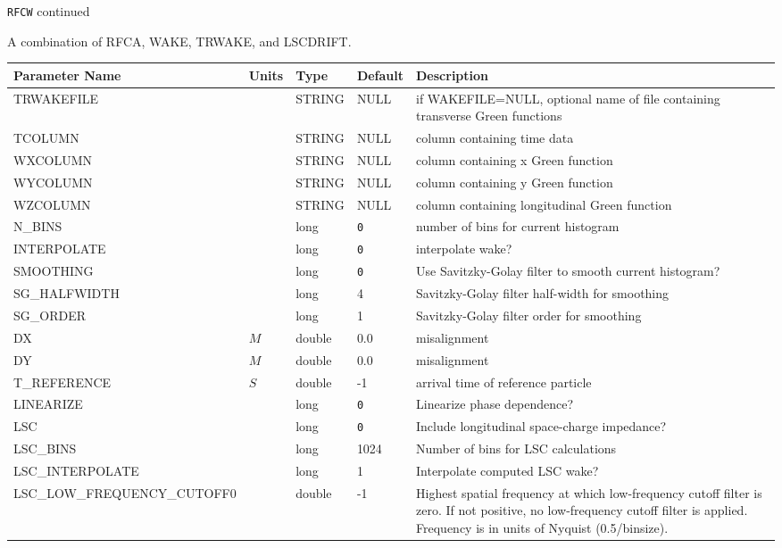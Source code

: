 \newpage
\begin{center}{\Large\verb|RFCW| continued}\end{center}
A combination of RFCA, WAKE, TRWAKE, and LSCDRIFT.
\\
\begin{tabular}{|l|l|l|l|p{\descwidth}|} \hline
Parameter Name & Units & Type & Default & Description \\ \hline 
TRWAKEFILE &  & STRING &   NULL            & if WAKEFILE=NULL, optional name of file containing transverse Green functions  \\ \hline 
TCOLUMN &  & STRING &   NULL            & column containing time data  \\ \hline 
WXCOLUMN &  & STRING &   NULL            & column containing x Green function  \\ \hline 
WYCOLUMN &  & STRING &   NULL            & column containing y Green function  \\ \hline 
WZCOLUMN &  & STRING &   NULL            & column containing longitudinal Green function  \\ \hline 
N\_BINS &  & long &  \verb|0| & number of bins for current histogram  \\ \hline 
INTERPOLATE &  & long &  \verb|0| & interpolate wake?  \\ \hline 
SMOOTHING &  & long &  \verb|0| & Use Savitzky-Golay filter to smooth current histogram?  \\ \hline 
SG\_HALFWIDTH &  & long &   4               & Savitzky-Golay filter half-width for smoothing  \\ \hline 
SG\_ORDER &  & long &   1               & Savitzky-Golay filter order for smoothing  \\ \hline 
DX & $M$ & double &  0.0 & misalignment  \\ \hline 
DY & $M$ & double &  0.0 & misalignment  \\ \hline 
T\_REFERENCE & $S$ & double &   -1 & arrival time of reference particle  \\ \hline 
LINEARIZE &  & long &  \verb|0| & Linearize phase dependence?  \\ \hline 
LSC &  & long &  \verb|0| & Include longitudinal space-charge impedance?  \\ \hline 
LSC\_BINS &  & long &   1024            & Number of bins for LSC calculations  \\ \hline 
LSC\_INTERPOLATE &  & long &   1               & Interpolate computed LSC wake?  \\ \hline 
LSC\_LOW\_FREQUENCY\_CUTOFF0 &  & double &   -1 & Highest spatial frequency at which low-frequency cutoff filter is zero.  If not positive, no low-frequency cutoff filter is applied. Frequency is in units of Nyquist (0.5/binsize).  \\ \hline 
\end{tabular}

